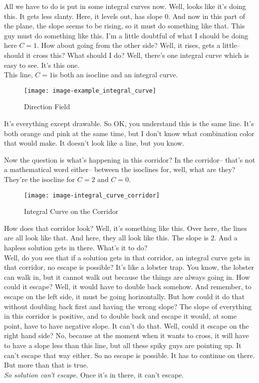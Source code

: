 All we have to do is put in some integral curves now.
Well, looks like it's doing this. It gets less slanty. Here, it levels out, has slope $0$.
And now in this part of the plane, the slope seems to be rising, so it must do something like that.
This guy must do something like this.
I'm a little doubtful of what I should be doing here $C = 1$.
How about going from the other side?
Well, it rises, gets a little-- should it cross this?
What should I do?
Well, there's one integral curve which is easy to see.
It's this one.\\
This line, $C = 1$is both an isocline and an integral curve.

\begin{figure}[ht!]
  \centering
  \texttt{[image: image-example\_integral\_curve]}
  \caption{Direction Field}
\end{figure}

It's everything except drawable.
So OK, you understand this is the same line.
It's both orange and pink at the same time,
but I don't know what combination color
that would make.
It doesn't look like a line, but you know.

\clearpage

Now the question is what's happening in this corridor?
In the corridor-- that's not a mathematical word either--
between the isoclines for, well, what are they?
They're the isocline for $C =  2$ and $C = 0$.\\

\begin{wrapfigure}{r}{5.5cm}
  \texttt{[image: image-integral\_curve\_corridor]}
  \caption{Integral Curve on the Corridor}
\end{wrapfigure}

How does that corridor look? Well, it's something like this.
Over here, the lines are all look like that. And here, they all look like this.
The slope is $2$. And a hapless solution gets in there.
What's it to do?\\
Well, do you see that if a solution gets in that corridor,
an integral curve gets in that corridor, no escape is possible?
It's like a lobster trap. You know, the lobster can walk in, but it cannot walk out
because the things are always going in. How could it escape?
Well, it would have to double back somehow.
And remember, to escape on the left side, it must be going horizontally.
But how could it do that without doubling back first and having the wrong slope?
The slope of everything in this corridor is positive,
and to double back and escape it would, at some point, have to have negative slope.
It can't do that. Well, could it escape on the right hand side?
No, because at the moment when it wants to cross, it will have to have a slope less than this line,
but all these spiky guys are pointing up. It can't escape that way either.
So no escape is possible. It has to continue on there. But more than that is true.\\
\emph{So solution can't escape}.
Once it's in there, it can't escape. \\

